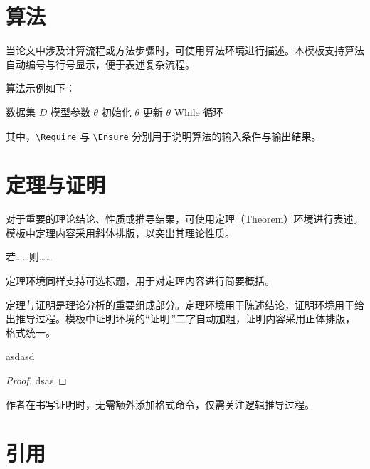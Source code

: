 \section{算法}

当论文中涉及计算流程或方法步骤时，可使用算法环境进行描述。本模板支持算法自动编号与行号显示，便于表述复杂流程。

算法示例如下：

\begin{algorithm}[H]
    \caption{示例算法}
    \begin{algorithmic}[1]
        \Require 数据集 $D$
        \Ensure 模型参数 $\theta$
        \State 初始化 $\theta$
            \State 更新 $\theta$
        \EndFor
            \State While 循环
        \EndWhile
    \end{algorithmic}
\end{algorithm}

其中，\texttt{\textbackslash Require} 与 \texttt{\textbackslash Ensure} 分别用于说明算法的输入条件与输出结果。

\section{定理与证明}

对于重要的理论结论、性质或推导结果，可使用定理（Theorem）环境进行表述。模板中定理内容采用斜体排版，以突出其理论性质。

\begin{theorem}[示例定理]
若……则……
\end{theorem}

定理环境同样支持可选标题，用于对定理内容进行简要概括。

定理与证明是理论分析的重要组成部分。定理环境用于陈述结论，证明环境用于给出推导过程。模板中证明环境的“证明.”二字自动加粗，证明内容采用正体排版，格式统一。

\begin{theorem}
    \label{th:1}
    asdasd
\end{theorem}

\begin{proof}
    dsas
\end{proof}

作者在书写证明时，无需额外添加格式命令，仅需关注逻辑推导过程。

\section{引用}


